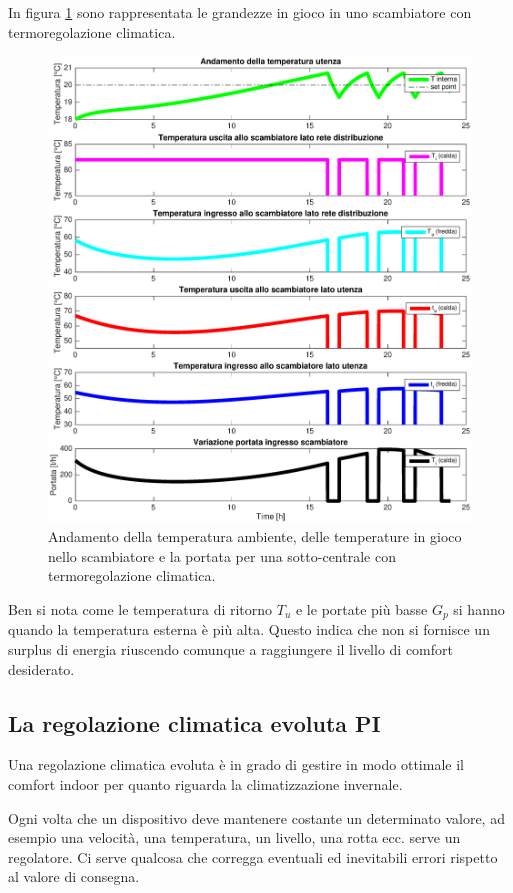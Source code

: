 \documentclass[laurea,oneside,11pt]{USiena_tesiLM}
\begin{document}
In figura \ref{fig:reg_climatica} sono rappresentata le grandezze in gioco in uno scambiatore con termoregolazione climatica.

\begin{figure}[!ht]
\centering
\includegraphics[width=\textwidth]{figure/reg_climatica} 
\caption{Andamento della temperatura ambiente, delle temperature in gioco nello scambiatore e la portata per una sotto-centrale con termoregolazione climatica.}
\label{fig:reg_climatica}
\end{figure}

Ben si nota come le temperatura di ritorno $T_u$ e le portate più basse  $G_p$ si hanno quando la temperatura esterna è più alta. Questo indica che non si fornisce un surplus di energia riuscendo comunque a raggiungere il livello di comfort desiderato.

\subsection{La regolazione climatica evoluta PI}
Una regolazione climatica evoluta è in grado di gestire in modo ottimale il comfort indoor per quanto riguarda la climatizzazione invernale.

Ogni volta che un dispositivo deve mantenere costante un determinato valore, ad esempio una velocità, una temperatura, un livello, una rotta ecc. serve un regolatore. Ci serve qualcosa che corregga eventuali ed inevitabili errori rispetto al valore di consegna.
 
\end{document}
